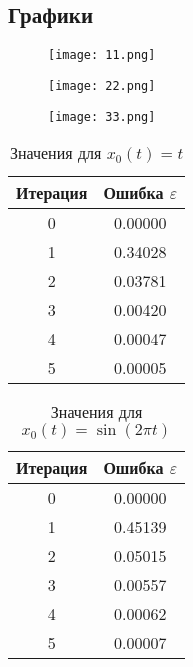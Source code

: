 \documentclass{article}
\begin{document}
\subsection{Графики}

\begin{figure}[!ht] 
    \centering
    \texttt{[image: 11.png]}
\end{figure}

\begin{figure}[!ht] 
    \centering
    \texttt{[image: 22.png]}
\end{figure}

\begin{figure}[!ht] 
    \centering
    \texttt{[image: 33.png]}
\end{figure}


\begin{table}[H]
    \centering
    \small
    \setlength{\tabcolsep}{10pt}
    \renewcommand{\arraystretch}{1.2}
    \caption{Значения для $x_0(t) = t$}
    \begin{tabular}{c c}
        \toprule
        Итерация & Ошибка $\varepsilon$ \\
        \midrule
        0 & 0.00000 \\
        1 & 0.34028 \\
        2 & 0.03781 \\
        3 & 0.00420 \\
        4 & 0.00047 \\
        5 & 0.00005 \\
        \bottomrule
    \end{tabular}
\end{table}

\begin{table}[H]
    \centering
    \small
    \setlength{\tabcolsep}{10pt}
    \renewcommand{\arraystretch}{1.2}
    \caption{Значения для $x_0(t) = \sin(2\pi t)$}
    \begin{tabular}{c c}
        \toprule
        Итерация & Ошибка $\varepsilon$ \\
        \midrule
        0 & 0.00000 \\
        1 & 0.45139 \\
        2 & 0.05015 \\
        3 & 0.00557 \\
        4 & 0.00062 \\
        5 & 0.00007 \\
        \bottomrule
    \end{tabular}
\end{table}
\end{document}
